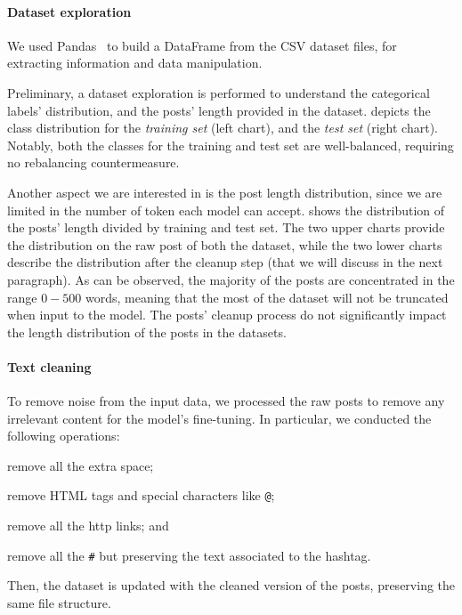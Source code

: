 \documentclass[11pt]{article}
\begin{document}
\paragraph{Dataset exploration}
We used Pandas~\cite{reback2020pandas} to build a DataFrame from the CSV dataset files,
for extracting information and data manipulation.

Preliminary,
a dataset exploration is performed to understand the categorical labels' distribution,
and the posts' length provided in the dataset.
%
 depicts the class distribution for the \emph{training set} (left chart),
and the \emph{test set} (right chart).
%
Notably,
both the classes for the training and test set are well-balanced,
requiring no rebalancing countermeasure.

Another aspect we are interested in is the post length distribution,
since we are limited in the number of token each model can accept.
%
 shows the distribution of the posts' length divided by training and test set.
%
The two upper charts provide the distribution on the raw post of both the dataset,
while the two lower charts describe the distribution after the cleanup step (that we will discuss in the next paragraph).
%
As can be observed,
the majority of the posts are concentrated in the range $0-500$ words,
meaning that the most of the dataset will not be truncated when input to the model.
%
The posts' cleanup process do not significantly impact the length distribution of the posts in the datasets.

\paragraph{Text cleaning}
To remove noise from the input data,
we processed the raw posts to remove any irrelevant content for the model's fine-tuning.
%
In particular,
we conducted the following operations:
\begin{enumerate*}[label=(\roman{*})]
  \item remove all the extra space;
  \item remove HTML tags and special characters like \texttt{@};
  \item remove all the http links; and
  \item remove all the \texttt{\#} but preserving the text associated to the hashtag.
\end{enumerate*}
Then,
the dataset is updated with the cleaned version of the posts,
preserving the same file structure.
\end{document}
